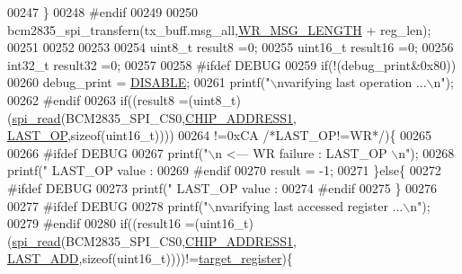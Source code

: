 \begin{DoxyCode}
{{{00247        \}
00248 \textcolor{preprocessor}{    #endif}
00249 \textcolor{preprocessor}{}
00250     bcm2835\_spi\_transfern(tx\_buff.msg\_all,\hyperlink{a00040_ac85ecf34a5cbd85d6dbd51b4c9a5469e}{WR\_MSG\_LENGTH} + reg\_len);
00251     
00252 
00253     
00254     uint8\_t  result8  =0;
00255     uint16\_t result16 =0;
00256     int32\_t result32 =0;    
00257     
00258 \textcolor{preprocessor}{     #ifdef DEBUG }
00259 \textcolor{preprocessor}{}     \textcolor{keywordflow}{if}(!(debug\_print&0x80))
00260      debug\_print = \hyperlink{a00036_a99496f7308834e8b220f7894efa0b6ab}{DISABLE};
00261        printf(\textcolor{stringliteral}{"\(\backslash\)nvarifying last operation  ...\(\backslash\)n"});
00262 \textcolor{preprocessor}{     #endif}
00263 \textcolor{preprocessor}{}     \textcolor{keywordflow}{if}((result8 =(uint8\_t)(\hyperlink{a00006_ga7ad9f65ee46aca507374096506a0b1c4}{spi\_read}(BCM2835\_SPI\_CS0,\hyperlink{a00036_a94de2b046db6e10257ef4481c0a15eaa}{CHIP\_ADDRESS1},
      \hyperlink{a00035_aed1301248abf6c26045727a190f6550a}{LAST\_OP},\textcolor{keyword}{sizeof}(uint16\_t))))
00264      !=0xCA \textcolor{comment}{/*LAST\_OP!=WR*/})\{
00265              
00266 \textcolor{preprocessor}{     #ifdef DEBUG}
00267 \textcolor{preprocessor}{}       printf(\textcolor{stringliteral}{"\(\backslash\)n                                               <---  WR failure : LAST\_OP \(\backslash\)n"});
00268        printf(\textcolor{stringliteral}{"        LAST\_OP value  :%
00269 \textcolor{preprocessor}{     #endif}
00270 \textcolor{preprocessor}{}     result = -1;
00271      \}\textcolor{keywordflow}{else}\{
00272 \textcolor{preprocessor}{      #ifdef DEBUG}
00273 \textcolor{preprocessor}{}       printf(\textcolor{stringliteral}{"        LAST\_OP value  :%
00274 \textcolor{preprocessor}{     #endif}
00275 \textcolor{preprocessor}{}     \}
00276      
00277 \textcolor{preprocessor}{     #ifdef DEBUG}
00278 \textcolor{preprocessor}{}       printf(\textcolor{stringliteral}{"\(\backslash\)nvarifying last accessed register  ...\(\backslash\)n"});
00279 \textcolor{preprocessor}{     #endif}
00280 \textcolor{preprocessor}{}     \textcolor{keywordflow}{if}((result16 =(uint16\_t)(\hyperlink{a00006_ga7ad9f65ee46aca507374096506a0b1c4}{spi\_read}(BCM2835\_SPI\_CS0,\hyperlink{a00036_a94de2b046db6e10257ef4481c0a15eaa}{CHIP\_ADDRESS1},
      \hyperlink{a00035_adab6c053c389db762442c88b7e32e543}{LAST\_ADD},\textcolor{keyword}{sizeof}(uint16\_t))))!=\hyperlink{a00040_ac02048009fa6718e40f028b6bae63f3d}{target\_register})\{
}}}}}
\end{DoxyCode}
